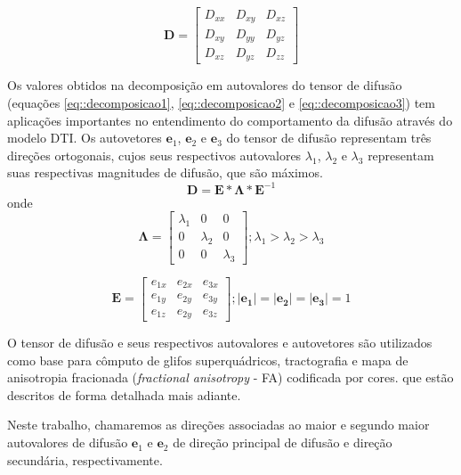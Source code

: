 \documentclass[
    12pt,                %
    oneside,            %
    a4paper,            %
    english,            %
    french,                %
    spanish,            %
    brazil                %
    ]{abntex2}
\begin{document}
\begin{equation}
\label{eq::tensor}
\mathbf{D} = 
\begin{bmatrix}
D_{xx} & D_{xy} & D_{xz} \\ 
D_{xy} & D_{yy} & D_{yz} \\ 
D_{xz} & D_{yz} & D_{zz}  
\end{bmatrix}
\end{equation}


Os valores obtidos na decomposição em autovalores do tensor de difusão (equações \ref{eq::decomposicao1}, \ref{eq::decomposicao2} e \ref{eq::decomposicao3}) tem aplicações importantes no entendimento do comportamento da difusão através do modelo DTI. Os autovetores $\mathbf{e}_1$, $\mathbf{e}_2$ e $\mathbf{e}_3$ do tensor de difusão representam três direções ortogonais, cujos seus respectivos autovalores $\lambda_1$, $\lambda_2$ e $\lambda_3$ representam suas respectivas magnitudes de difusão, que são máximos. 
\begin{equation}
\label{eq::decomposicao1}
\mathbf{D} = \mathbf{E}*\mathbf{\Lambda}*\mathbf{E}^{-1}
\end{equation}
onde
\begin{equation}
\label{eq::decomposicao2}
\mathbf{\Lambda} = \begin{bmatrix} 
\lambda_1 & 0 & 0 \\ 
0 & \lambda_2 & 0 \\ 
0 & 0 & \lambda_3  
\end{bmatrix};
\lambda_1 > \lambda_2 > \lambda_3
\end{equation}

\begin{equation}
\label{eq::decomposicao3}
\mathbf{E} = 
\begin{bmatrix} 
e_{1x} & e_{2x} & e_{3x} \\ 
e_{1y} & e_{2y} & e_{3y} \\ 
e_{1z} & e_{2y} & e_{3z}  
\end{bmatrix};
\mathbf{|e_1|} = \mathbf{|e_2|} = \mathbf{|e_3|} = 1
\end{equation}

O tensor de difusão e seus respectivos autovalores e autovetores são utilizados como base para cômputo de glifos superquádricos, tractografia e mapa de anisotropia fracionada (\textit{fractional anisotropy} - FA) codificada por cores. que estão descritos de forma detalhada mais adiante.

Neste trabalho, chamaremos as direções associadas ao maior e segundo maior autovalores de difusão $\mathbf{e}_1$ e $\mathbf{e}_2$ de direção principal de difusão e direção secundária, respectivamente.
\end{document}
